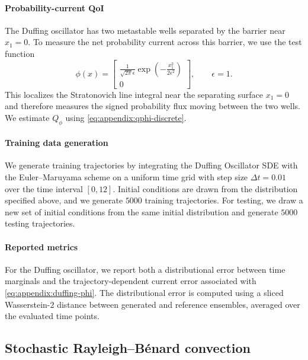 \documentclass[oneside,11pt]{article}
\theoremstyle{remark}
\begin{document}
\paragraph{Probability-current QoI}
The Duffing oscillator has two metastable wells separated by the barrier near
$x_1=0$.  To measure the net probability current across this barrier, we use
the test function
\begin{equation}
    \phi(x)
    =
    \begin{bmatrix}
    \displaystyle
    \frac{1}{\sqrt{2\pi}\epsilon}
    \exp\!\left(-\frac{x_1^2}{2\epsilon^2}\right)
    \\
    0
    \end{bmatrix},
    \qquad
    \epsilon = 1.
    \label{eq:appendix:duffing-phi}
\end{equation}
This localizes the Stratonovich line integral near the separating surface
$x_1=0$ and therefore measures the signed probability flux moving between
the two wells.  We estimate $Q_\phi$ using
\eqref{eq:appendix:qphi-discrete}.

\paragraph{Training data generation} 
We generate training trajectories by integrating the Duffing Oscillator SDE with the Euler--Maruyama scheme on a uniform time grid with step size $\Delta t = 0.01$ over the time interval $[0, 12]$. Initial conditions are drawn from the distribution specified above, and we generate $ 5000$ training trajectories. For testing, we draw a new set of initial conditions from the same initial distribution and generate $5000$ testing trajectories. 

\paragraph{Reported metrics}
For the Duffing oscillator, we report both a distributional error between
time marginals and the trajectory-dependent current error associated with
\eqref{eq:appendix:duffing-phi}.  The distributional error is computed using
a sliced Wasserstein-$2$ distance between generated and reference ensembles,
averaged over the evaluated time points.

\subsection{Stochastic Rayleigh--Bénard convection}\label{appendix:RayleighDetails}
\end{document}
